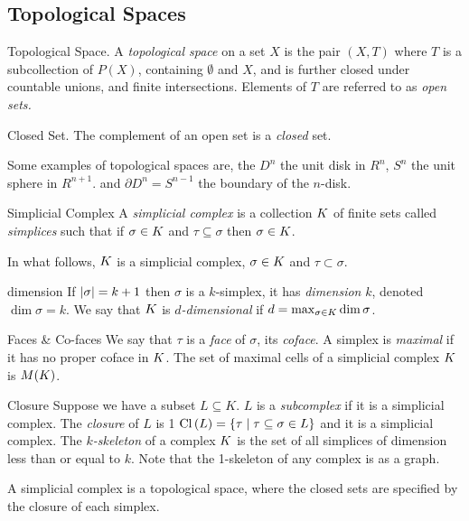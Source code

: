 \subsection{Topological Spaces}
\begin{definition}{Topological Space.}
A \emph{topological space} on a set $X$ is the pair $(X,T)$ where $T$ is a subcollection of $P(X)$, containing $\emptyset$ and $X$, and is further closed under countable unions, and finite intersections. Elements of $T$ are referred to as \emph{open sets.}
\end{definition}
\begin{definition}{Closed Set.}
 The complement of an open set is a \emph{closed} set.
\end{definition}
Some examples of topological spaces are, the $D^n$ the unit disk in $R^n$, $S^n$ the unit sphere in $R^{n+1}$. and $\partial D^n = S^{n-1}$ the boundary of the $n$-disk.  
\begin{definition}{Simplicial Complex}
A \emph{simplicial complex} is a collection $K$ of finite sets called
\emph{simplices} such that if $\sigma \in K$ and $\tau \subseteq \sigma$ then $\sigma \in K$. 
\end{definition}
In what follows, $K$ is a simplicial complex, $\sigma \in K$ and $\tau \subset \sigma$.
\begin{definition}{dimension}
If $|\sigma| = k+1$ then $\sigma$ is a $k$-simplex, it has \emph{dimension} $k$, denoted 
$\dim{\sigma} = k$. We say that $K$ is \emph{$d$-dimensional} if 
$d = \max_{\sigma \in K} \dim{\sigma}$.
\end{definition}
\begin{definition}{Faces \& Co-faces}
We say that $\tau$ is a \emph{face} of $\sigma$, its \emph{coface}. A simplex is \emph{maximal} if it has no proper coface in $K$. The set of maximal cells of a simplicial complex $K$ is $M(K)$. 
 \end{definition}
\begin{definition}{Closure}
Suppose we have a subset $L \subseteq K$.  $L$ is a \emph{subcomplex}
if it is a simplicial complex. The \emph{closure} of $L$ is 1
$\operatorname{Cl}{(}L) = \{ \tau \mid \tau \subseteq \sigma \in L\}$ and it is a simplicial complex. The 
\emph{$k$-skeleton} of a complex $K$ is the set of all simplices
of dimension less than or equal to $k$. Note that the 1-skeleton of
any complex is as a graph.
\end{definition}
A simplicial complex is a topological space, where the closed sets are specified by the closure of each simplex.
